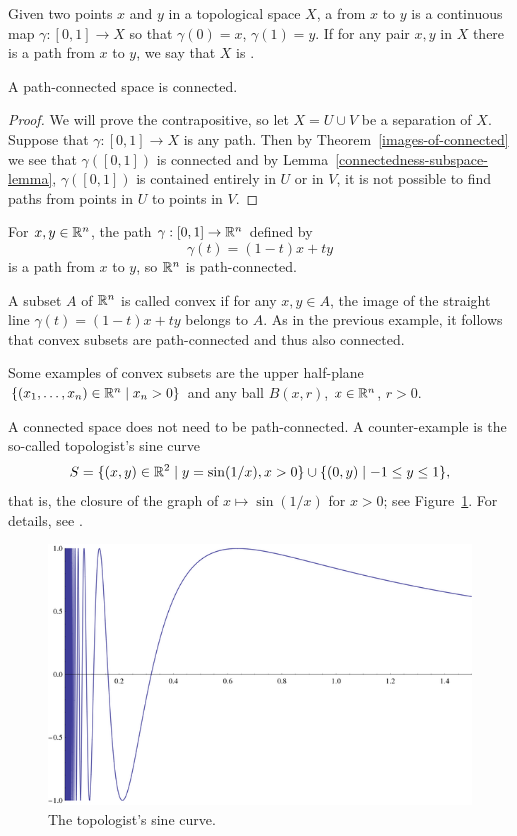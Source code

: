\begin{defn}
  Given two points $x$ and $y$ in a topological space $X$, a  from $x$ to $y$ is a continuous map $\gamma : [0,1] \to X$ so that $\gamma(0) = x$, $\gamma(1) = y$. If for any pair $x,y$ in $X$ there is a path from $x$ to $y$, we say that $X$ is .
\end{defn}
\begin{prop}
  \label{path-connected-implies-connected}
  A path-connected space is connected.
\end{prop}
\begin{proof}
  We will prove the contrapositive, so let $X = U \cup V$ be a separation of $X$. Suppose that $\gamma : [0,1] \to X$ is any path. Then by Theorem~\ref{images-of-connected} we see that $\gamma([0,1])$ is connected and by Lemma~\ref{connectedness-subspace-lemma}, $\gamma([0,1])$ is contained entirely in $U$ or in $V$, it is not possible to find paths from points in $U$ to points in $V$.
\end{proof}
\begin{example}
  For $x, y \in \mathbb{R}^n$, the path $\gamma : [0,1] \to \mathbb{R}^n$ defined by
  \[
    \gamma(t) = (1-t)x + ty
  \]
  is a path from $x$ to $y$, so $\mathbb{R}^n$ is path-connected.
\end{example}
\begin{example}
  A subset $A$ of $\mathbb{R}^n$ is called convex if for any $x,y \in A$, the image of the straight line $\gamma(t) = (1-t)x + ty$ belongs to $A$. As in the previous example, it follows that convex subsets are path-connected and thus also connected.
  
  Some examples of convex subsets are the upper half-plane $\{(x_1,\dots,x_n) \in \mathbb{R}^n \mid x_n > 0\}$ and any ball $B(x,r)$, $x \in \mathbb{R}^n$, $r > 0$.
\end{example}
\begin{example}
  A connected space does not need to be path-connected. A counter-example is the so-called topologist's sine curve
  \[
    S = \{(x,y) \in \mathbb{R}^2 \mid y = \sin(1/x), x > 0 \} \cup \{(0,y) \mid -1 \leq y \leq 1 \},
  \]
  that is, the closure of the graph of $x \mapsto \sin(1/x)$ for $x > 0$; see Figure~\ref{sinecurve}. For details, see \cite[\S 24]{Mun}.
  \begin{figure}
    \centering
    \includegraphics[width=.6\linewidth]{images/sinecurve}
    \caption{The topologist's sine curve.}
    \label{sinecurve}
  \end{figure}
\end{example}
